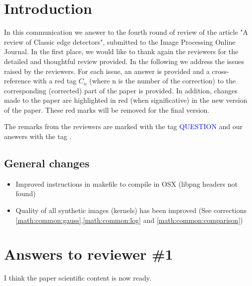 \documentclass[a4paper,10pt]{report}
\title{}
\author{}
\begin{document}
\maketitle


\chapter{Introduction}
In this communication we answer to the fourth round of review of the article "A review of Classic edge detectors", submitted to the Image Processing Online Journal.
In the first place, we would like to thank again the reviewers for the detailed and thoughtful review provided. In the following we address the issues raised by the reviewers. For each issue, an answer is provided and a cross-reference with a red tag $C_n$ (where n is the number of the correction) to the corresponding (corrected) part of the paper is provided. In addition, changes made to the paper are highlighted in red (when significative) in the new version of the paper. 
These red marks will be removed for the final version.

The remarks from the reviewers are marked with the tag \textcolor{blue}{QUESTION} and our answers with the tag \ans.

\section{General changes}
\begin{itemize}
 \item Improved instructions in makefile to compile in OSX (libpng headers not found)
 \item Quality of all synthetic images (kernels) has been improved (See corrections \ref{math:common:gauss},\ref{math:common:log} and \ref{math:common:comparison})

\end{itemize}


\chapter{Answers to reviewer \#1}

\que I think the paper scientific content is now ready.\\
\end{document}
